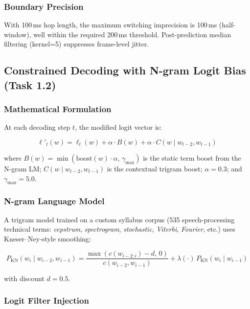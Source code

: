 \documentclass[11pt]{article}
\begin{document}
\subsubsection{Boundary Precision}

With 100\,ms hop length, the maximum switching imprecision is 100\,ms
(half-window), well within the required 200\,ms threshold. Post-prediction
median filtering (kernel=5) suppresses frame-level jitter.

\subsection{Constrained Decoding with N-gram Logit Bias (Task 1.2)}

\subsubsection{Mathematical Formulation}

At each decoding step $t$, the modified logit vector is:

\begin{equation}
  \ell'_t(w) = \ell_t(w) + \alpha\cdot B(w) + \alpha\cdot C(w\mid w_{t-2},w_{t-1})
\end{equation}

where $B(w) = \min(\mathrm{boost}(w)\cdot\alpha,\,\gamma_{\max})$ is the
static term boost from the N-gram LM; $C(w\mid w_{t-2},w_{t-1})$ is the
contextual trigram boost; $\alpha=0.3$; and $\gamma_{\max}=5.0$.

\subsubsection{N-gram Language Model}

A trigram model trained on a custom syllabus corpus (535 speech-processing
technical terms: \emph{cepstrum}, \emph{spectrogram}, \emph{stochastic},
\emph{Viterbi}, \emph{Fourier}, etc.) uses Kneser--Ney-style smoothing:

\begin{equation}
  P_{\mathrm{KN}}(w_i\mid w_{i-2},w_{i-1}) =
  \frac{\max(c(w_{i-2:i})-d,\,0)}{c(w_{i-2},w_{i-1})}
  + \lambda(\cdot)\,P_{\mathrm{KN}}(w_i\mid w_{i-1})
\end{equation}

with discount $d=0.5$.

\subsubsection{Logit Filter Injection}
\end{document}
